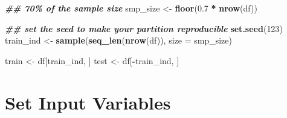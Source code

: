 \documentclass[
]{article}
\newenvironment{Shaded}{\begin{snugshade}}{\end{snugshade}}
\newcommand{\AttributeTok}[1]{\textcolor[rgb]{0.13,0.29,0.53}{#1}}
\newcommand{\DecValTok}[1]{\textcolor[rgb]{0.00,0.00,0.81}{#1}}
\newcommand{\DocumentationTok}[1]{\textcolor[rgb]{0.56,0.35,0.01}{\textbf{\textit{#1}}}}
\newcommand{\FloatTok}[1]{\textcolor[rgb]{0.00,0.00,0.81}{#1}}
\newcommand{\FunctionTok}[1]{\textcolor[rgb]{0.13,0.29,0.53}{\textbf{#1}}}
\newcommand{\NormalTok}[1]{#1}
\newcommand{\OtherTok}[1]{\textcolor[rgb]{0.56,0.35,0.01}{#1}}
\newcommand{\SpecialCharTok}[1]{\textcolor[rgb]{0.81,0.36,0.00}{\textbf{#1}}}
\newcommand{\StringTok}[1]{\textcolor[rgb]{0.31,0.60,0.02}{#1}}
\begin{document}
\begin{Shaded}
\begin{Highlighting}[]
\DocumentationTok{\#\# 70\% of the sample size}
\NormalTok{smp\_size }\OtherTok{\textless{}{-}} \FunctionTok{floor}\NormalTok{(}\FloatTok{0.7} \SpecialCharTok{*} \FunctionTok{nrow}\NormalTok{(df))}

\DocumentationTok{\#\# set the seed to make your partition reproducible}
\FunctionTok{set.seed}\NormalTok{(}\DecValTok{123}\NormalTok{)}
\NormalTok{train\_ind }\OtherTok{\textless{}{-}} \FunctionTok{sample}\NormalTok{(}\FunctionTok{seq\_len}\NormalTok{(}\FunctionTok{nrow}\NormalTok{(df)), }\AttributeTok{size =}\NormalTok{ smp\_size)}

\NormalTok{train }\OtherTok{\textless{}{-}}\NormalTok{ df[train\_ind, ]}
\NormalTok{test }\OtherTok{\textless{}{-}}\NormalTok{ df[}\SpecialCharTok{{-}}\NormalTok{train\_ind, ]}
\end{Highlighting}
\end{Shaded}

\section{Set Input Variables}\label{set-input-variables}

\begin{Shaded}
\end{Shaded}
\end{document}

